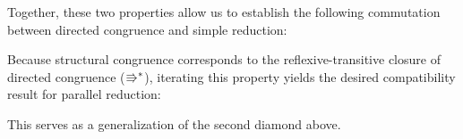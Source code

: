 Together, these two properties allow us to establish the following commutation
between directed congruence and simple reduction:
\begin{center}
\end{center}

Because structural congruence corresponds to the reflexive-transitive closure of
directed congruence ($\Rrightarrow^*$), iterating this property yields the desired
compatibility result for parallel reduction:
\begin{center}
\end{center}
This serves as a generalization of the second diamond above.

